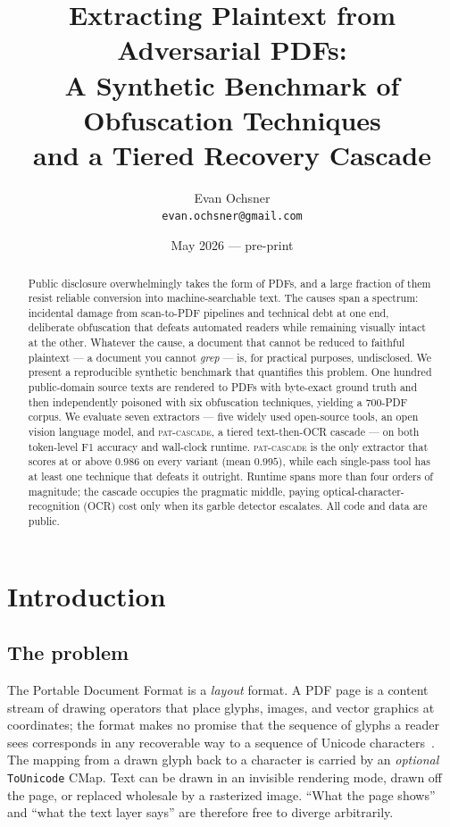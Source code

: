 \documentclass[11pt]{article}
\title{\bfseries Extracting Plaintext from Adversarial PDFs:\\[2pt]
  A Synthetic Benchmark of Obfuscation Techniques\\
  and a Tiered Recovery Cascade}
\author{Evan Ochsner\\
  \small\texttt{evan.ochsner@gmail.com}}
\date{May 2026 --- pre-print}
\begin{document}
\maketitle

\begin{abstract}
\noindent
Public disclosure overwhelmingly takes the form of PDFs, and a large
fraction of them resist reliable conversion into machine-searchable
text. The causes span a spectrum: incidental damage from scan-to-PDF
pipelines and technical debt at one end, deliberate obfuscation that
defeats automated readers while remaining visually intact at the other.
Whatever the cause, a document that cannot be reduced to faithful
plaintext --- a document you cannot \emph{grep} --- is, for practical
purposes, undisclosed. We present a reproducible synthetic benchmark
that quantifies this problem. One hundred public-domain source texts
are rendered to PDFs with byte-exact ground truth and then independently
poisoned with six obfuscation techniques, yielding a 700-PDF corpus.
We evaluate seven extractors --- five widely used open-source tools, an
open vision language model, and \mbox{\textsc{pat-cascade}}, a tiered
text-then-OCR cascade --- on both token-level F1 accuracy and wall-clock
runtime. \textsc{pat-cascade} is the only extractor that scores at or
above $0.986$ on every variant (mean $0.995$), while each single-pass
tool has at least one technique that defeats it outright. Runtime spans
more than four orders of magnitude; the cascade occupies the pragmatic
middle, paying optical-character-recognition (OCR) cost only when its
garble detector escalates. All code and data are public.
\end{abstract}

\section{Introduction}

\subsection{The problem}

The Portable Document Format is a \emph{layout} format. A PDF page is a
content stream of drawing operators that place glyphs, images, and
vector graphics at coordinates; the format makes no promise that the
sequence of glyphs a reader sees corresponds in any recoverable way to a
sequence of Unicode characters~\cite{pdfspec}. The mapping from a drawn
glyph back to a character is carried by an \emph{optional}
\texttt{ToUnicode} CMap. Text can be drawn in an invisible rendering
mode, drawn off the page, or replaced wholesale by a rasterized image.
``What the page shows'' and ``what the text layer says'' are therefore
free to diverge arbitrarily.
\end{document}
